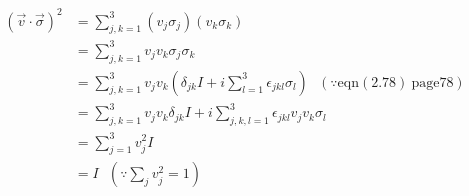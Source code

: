 \documentclass[10pt]{book}
\begin{document}
	\begin{equation}
\begin{aligned}
		(\vec{v} \cdot \vec{\sigma})^2 &= \sum_{j,k=1}^3 (v_j \sigma_j)  (v_k \sigma_k)\\
		&= \sum_{j,k=1}^3 v_j v_k \sigma_j \sigma_k\\
		&= \sum_{j,k=1}^3 v_j v_k \left(\delta_{jk}I + i \sum_{l=1}^3 \epsilon_{jkl}\sigma_l \right) ~~~(\because \text{eqn}(2.78)~ \text{page} 78)\\
		&= \sum_{j,k=1}^3 v_j v_k \delta_{jk}I  + i \sum_{j,k,l=1}^3 \epsilon_{jkl} v_j v_k \sigma_l\\
		&= \sum_{j=1}^3 v_j^2 I\\
		&= I ~~~\left(\because \sum_j v_j^2 = 1 \right)
	\end{aligned}
\end{equation}
	
\end{document}
